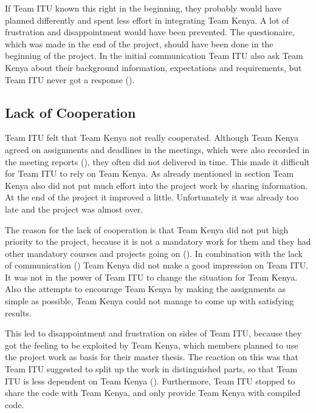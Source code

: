 If Team ITU known this right in the beginning, they probably would have planned differently and spent less effort in integrating Team Kenya. A lot of frustration and disappointment would have been prevented. The questionaire, which was made in the end of the project, should have been done in the beginning of the project. In the initial communication Team ITU also ask Team Kenya about their background information, expectations and requirements, but Team ITU never got a response ().


\subsection{Lack of Cooperation}
Team ITU felt that Team Kenya not really cooperated. Although Team Kenya agreed on assignments and deadlines in the meetings, which were also recorded in the meeting reports (), they often did not delivered in time. This made it difficult for Team ITU to rely on Team Kenya. As already mentioned in section  Team Kenya also did not put much effort into the project work by sharing information. At the end of the project it improved a little. Unfortunately it was already too late and the project was almost over.

The reason for the lack of cooperation is that Team Kenya did not put high priority to the project, because it is not a mandatory work for them and they had other mandatory courses and projects going on (). In combination with the lack of communication () Team Kenya did not make a good impression on Team ITU. It was not in the power of Team ITU to change the situation for Team Kenya. Also the attempts to encourage Team Kenya by making the assignments as simple as possible, Team Kenya could not manage to come up with satisfying results.

This led to disappointment and frustration on sides of Team ITU, because they got the feeling to be exploited by Team Kenya, which members planned to use the project work as basis for their master thesis. The reaction on this was that Team ITU suggested to split up the work in distinguished parts, so that Team ITU is less dependent on Team Kenya (). Furthermore, Team ITU stopped to share the code with Team Kenya, and only provide Team Kenya with compiled code.


